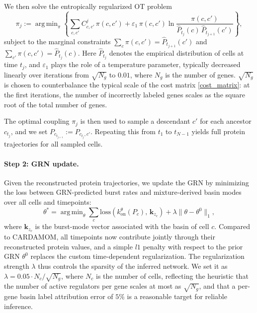 \documentclass[a4paper, 11pt]{article}
\DeclareMathOperator*{\argmin}{arg\,min}
\theoremstyle{plain}
\theoremstyle{remark}
\begin{document}
We then solve the entropically regularized OT problem
\begin{equation}
    \label{eq:proteins_update}
    \pi_j := \argmin_{\pi}\left\{\sum_{c,c'} C^j_{c,c'}\,\pi(c,c') + \varepsilon_1\,\pi(c,c')\ln\frac{\pi(c,c')}{\hat{P}_{t_j}(c)\,\hat{P}_{t_{j+1}}(c')}\right\},
\end{equation}
subject to the marginal constraints $\sum_c \pi(c,c') = \hat{P}_{t_{j+1}}(c')$ and $\sum_{c'}\pi(c,c') = \hat{P}_{t_j}(c)$. Here $\hat{P}_{t_j}$ denotes the empirical distribution of cells at time $t_j$, and $\varepsilon_1$ plays the role of a temperature parameter, typically decreased linearly over iterations from $\sqrt{N_g}$ to $0.01$, where $N_g$ is the number of genes. $\sqrt{N_g}$ is chosen to counterbalance the typical scale of the cost matrix \eqref{cost_matrix}: at the first iterations, the number of incorrectly labeled genes scales as the square root of the total number of genes.

The optimal coupling $\pi_j$ is then used to sample a descendant $c'$ for each ancestor $c_{t_j}$, and we set $P_{c_{t_{j+1}}} := P_{c_{t_j},c'}$. Repeating this from $t_1$ to $t_{N-1}$ yields full protein trajectories for all sampled cells.

\paragraph{Step 2: GRN update.}

Given the reconstructed protein trajectories, we update the GRN by minimizing the loss between GRN-predicted burst rates and mixture-derived basin modes over all cells and timepoints:
\begin{equation}
\label{eq:GRN_update}
\theta^{\ast}
   = \argmin_{\theta}
      \sum_{c}
      \mathrm{loss}\!\left(k^{\theta}_{\mathrm{on}}(P_c),\, \mathbf{k}_{z_c}\right)
      + \lambda \|\theta - \theta^0\|_1,
\end{equation}
where $\mathbf{k}_{z_c}$ is the burst-mode vector associated with the basin of cell $c$. Compared to CARDAMOM, all timepoints now contribute jointly through their reconstructed protein values, and a simple $l1$ penalty with respect to the prior GRN $\theta^0$ replaces the custom time-dependent regularization. The regularization strength $\lambda$ thus controls the sparsity of the inferred network. We set it as $\lambda = 0.05 \cdot {N_c}/\sqrt{N_g}$, where $N_c$ is the number of cells,
reflecting the heuristic that the number of active regulators per gene scales at most as $\sqrt{N_g}$, and that a per-gene basin label attribution error of $5\%$ is a reasonable target for reliable inference.
\end{document}

